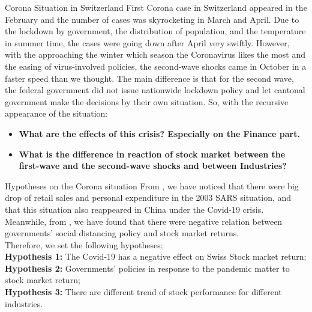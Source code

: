 \documentclass{beamer}
\begin{document}
\begin{frame}{Corona Situation in Switzerland}
First Corona case in Switzerland appeared in the February and the number of cases was skyrocketing in March and April. Due to the lockdown by government, the distribution of population, and  the temperature in summer time, the cases were going down after April very swiftly. However, with the approaching the winter which season the Coronavirus likes the most and the easing of virus-involved policies, the second-wave shocks came in October in a faster  speed than we thought. The main difference is that for the second wave, the federal government did not issue nationwide lockdown policy and let cantonal government make the decisions by their own situation. So, with the recursive appearance of the situation:\\
\begin{itemize}
    \item \textbf{What are the effects of this crisis? Especially on the Finance part.}\\
    \item \textbf{What is the difference in reaction of stock market  between the first-wave and the second-wave shocks and between Industries?}
\end{itemize}
\end{frame}

\begin{frame}{Hypotheses on the Corona situation }
From \cite{abiad2020economic}, we have noticed that there were big drop of retail sales and personal expenditure in the 2003 SARS situation, and that this situation also reappeared in China under the Covid-19 crisis.\\
Meanwhile, from \cite{ashraf2020economic}, we have found that there were negative relation between governments' social distancing policy and  stock market returns.\\
Therefore, we set the following hypotheses:\\
\textbf{Hypothesis 1:} The Covid-19 has a negative effect on Swiss Stock market return;\\
\textbf{Hypothesis 2:} Governments' policies in response to the pandemic matter to stock market return;\\
\textbf{Hypothesis 3:} There are different trend of stock performance for different industries.
    
\end{frame}
\end{document}
